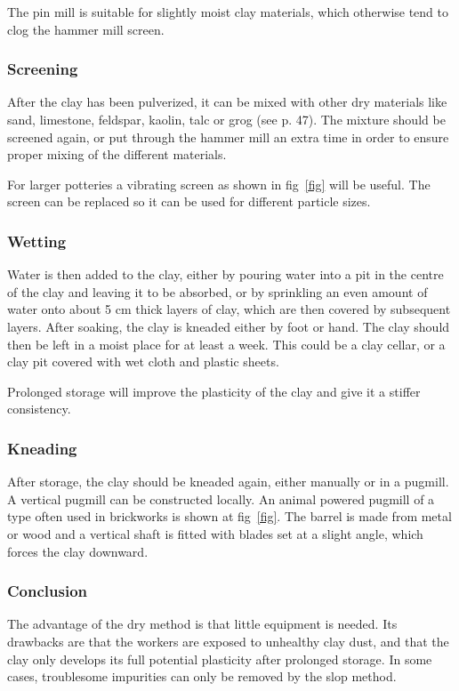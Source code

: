 The pin mill is suitable for slightly moist clay materials, which otherwise 
tend to clog the hammer mill screen.
\subsubsection{Screening}
After the clay has been pulverized, it can be mixed with other dry materials 
like sand, limestone, feldspar, kaolin, talc or grog (see p. 47). The mixture 
should be screened again, or put through the hammer mill an extra time in order 
to ensure proper mixing of the different materials.

For larger potteries a vibrating screen as shown in fig~\ref{fig} will be 
useful. 
The screen can be replaced so it can be used for different particle sizes.
\subsubsection{Wetting}
Water is then added to the clay, either by pouring water into a pit in the 
centre of the clay and leaving it to be absorbed, or by sprinkling an even 
amount of water onto about 5 cm thick layers of clay, which are then covered by 
subsequent layers. After soaking, the clay is kneaded either by foot or hand. 
The clay should then be left in a moist place for at least a week. This could 
be a clay cellar, or a clay pit covered with wet cloth and plastic sheets.

Prolonged storage will improve the plasticity of the clay and give it a stiffer 
consistency.
\subsubsection{Kneading}
After storage, the clay should be kneaded again, either manually or in a 
pugmill. A vertical pugmill can be constructed locally. An animal powered 
pugmill of a type often used in brickworks is shown at fig~\ref{fig}. The 
barrel is made from metal or wood and a vertical shaft is fitted with blades 
set at a slight angle, which forces the clay downward.
\subsubsection{Conclusion}
The advantage of the dry method is that little equipment is needed. Its 
drawbacks are that the workers are exposed to unhealthy clay dust, and that the 
clay only develops its full potential plasticity after prolonged storage. In 
some cases, troublesome impurities can only be removed by the slop method.
